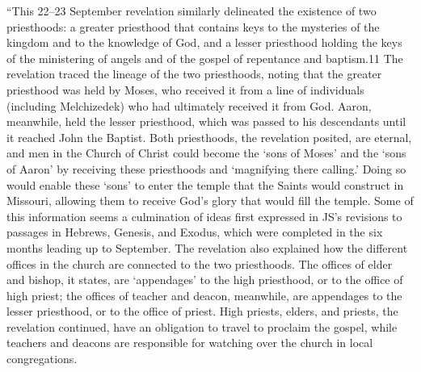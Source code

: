 			``This 22--23 September revelation similarly delineated the existence of two priesthoods: a greater priesthood that contains keys to the mysteries of the kingdom and to the knowledge of God, and a lesser priesthood holding the keys of the ministering of angels and of the gospel of repentance and baptism.11 The revelation traced the lineage of the two priesthoods, noting that the greater priesthood was held by Moses, who received it from a line of individuals (including Melchizedek) who had ultimately received it from God. Aaron, meanwhile, held the lesser priesthood, which was passed to his descendants until it reached John the Baptist. Both priesthoods, the revelation posited, are eternal, and men in the Church of Christ could become the `sons of Moses' and the `sons of Aaron' by receiving these priesthoods and `magnifying there calling.' Doing so would enable these `sons' to enter the temple that the Saints would construct in Missouri, allowing them to receive God's glory that would fill the temple. Some of this information seems a culmination of ideas first expressed in JS's revisions to passages in Hebrews, Genesis, and Exodus, which were completed in the six months leading up to September. The revelation also explained how the different offices in the church are connected to the two priesthoods. The offices of elder and bishop, it states, are `appendages' to the high priesthood, or to the office of high priest; the offices of teacher and deacon, meanwhile, are appendages to the lesser priesthood, or to the office of priest. High priests, elders, and priests, the revelation continued, have an obligation to travel to proclaim the gospel, while teachers and deacons are responsible for watching over the church in local congregations.

